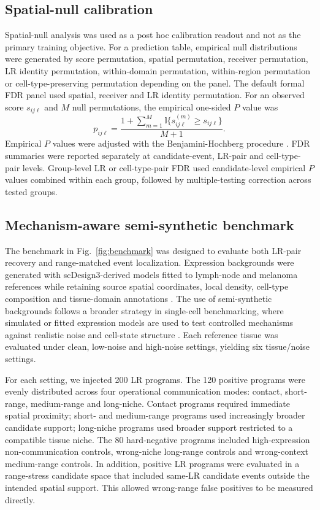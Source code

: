 \documentclass[referee,lineno,pdflatex,sn-vancouver-num]{sn-jnl}
\begin{document}
\subsection{Spatial-null calibration}

Spatial-null analysis was used as a post hoc calibration readout and not as the primary training objective. For a prediction table, empirical null distributions were generated by score permutation, spatial permutation, receiver permutation, LR identity permutation, within-domain permutation, within-region permutation or cell-type-preserving permutation depending on the panel. The default formal FDR panel used spatial, receiver and LR identity permutation. For an observed score $s_{ij\ell}$ and $M$ null permutations, the empirical one-sided $P$ value was
\begin{equation}
p_{ij\ell} = \frac{1+\sum_{m=1}^{M}\mathbb{I}\{s^{(m)}_{ij\ell}\geq s_{ij\ell}\}}{M+1}.
\end{equation}
Empirical $P$ values were adjusted with the Benjamini-Hochberg procedure \citep{benjamini1995fdr}. FDR summaries were reported separately at candidate-event, LR-pair and cell-type-pair levels. Group-level LR or cell-type-pair FDR used candidate-level empirical $P$ values combined within each group, followed by multiple-testing correction across tested groups.

\subsection{Mechanism-aware semi-synthetic benchmark}

The benchmark in Fig.~\ref{fig:benchmark} was designed to evaluate both LR-pair recovery and range-matched event localization. Expression backgrounds were generated with scDesign3-derived models fitted to lymph-node and melanoma references while retaining source spatial coordinates, local density, cell-type composition and tissue-domain annotations \citep{scdesign3}. The use of semi-synthetic backgrounds follows a broader strategy in single-cell benchmarking, where simulated or fitted expression models are used to test controlled mechanisms against realistic noise and cell-state structure \citep{splatter2017,muscat2020}. Each reference tissue was evaluated under clean, low-noise and high-noise settings, yielding six tissue/noise settings.

For each setting, we injected 200 LR programs. The 120 positive programs were evenly distributed across four operational communication modes: contact, short-range, medium-range and long-niche. Contact programs required immediate spatial proximity; short- and medium-range programs used increasingly broader candidate support; long-niche programs used broader support restricted to a compatible tissue niche. The 80 hard-negative programs included high-expression non-communication controls, wrong-niche long-range controls and wrong-context medium-range controls. In addition, positive LR programs were evaluated in a range-stress candidate space that included same-LR candidate events outside the intended spatial support. This allowed wrong-range false positives to be measured directly.
\end{document}
